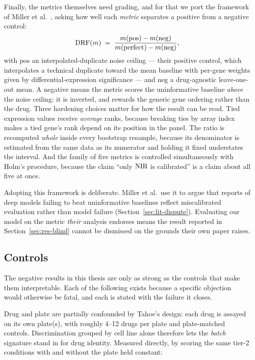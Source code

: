 

Finally, the metrics themselves need grading, and for that we port the framework of Miller
et al.~\cite{miller}, asking how well each \emph{metric} separates a positive from a negative
control:
\begin{equation}
  \textrm{DRF}(m) \;=\; \frac{m(\textrm{pos}) - m(\textrm{neg})}{m(\textrm{perfect}) - m(\textrm{neg})},
\end{equation}
with $\textrm{pos}$ an interpolated-duplicate noise ceiling --- their positive control, which
interpolates a technical duplicate toward the mean baseline with per-gene weights given by
differential-expression significance --- and $\textrm{neg}$ a drug-agnostic leave-one-out mean. A
negative \DRF{} means the metric scores the uninformative baseline \emph{above} the noise ceiling:
it is inverted, and rewards the generic gene ordering rather than the drug. Three hardening choices
matter for how the result can be read. Tied expression values receive \emph{average} ranks, because
breaking ties by array index makes a tied gene's rank depend on its position in the panel. The
\DRF{} ratio is recomputed \emph{whole} inside every bootstrap resample, because its denominator is
estimated from the same data as its numerator and holding it fixed understates the interval. And
the family of five metrics is controlled simultaneously with Holm's procedure, because the claim
``only $\textrm{NIR}$ is calibrated'' is a claim about all five at once.

Adopting this framework is deliberate. Miller et al.\ use it to argue that reports of deep models
failing to beat uninformative baselines reflect miscalibrated evaluation rather than model failure
(Section~\ref{sec:lit-dispute}). Evaluating our model on the metric \emph{their} analysis endorses
means the result reported in Section~\ref{sec:res-blind} cannot be dismissed on the grounds their
own paper raises.

\subsection{Controls}
\label{sec:methods-controls}

The negative results in this thesis are only as strong as the controls that make them
interpretable. Each of the following exists because a specific objection would otherwise be fatal,
and each is stated with the failure it closes.

Drug and plate are partially confounded by Tahoe's design: each drug is assayed on its own
plate(s), with roughly 4--12 drugs per plate and plate-matched controls. Discrimination grouped by
cell line alone therefore lets the \emph{batch} signature stand in for drug identity. Measured
directly, by scoring the same tier-2 conditions with and without the plate held constant:

